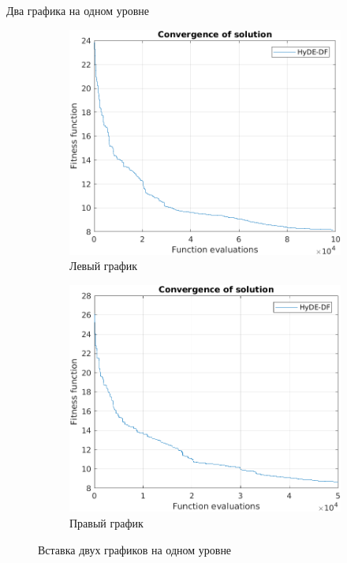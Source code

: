     Два графика на одном уровне
    \begin{figure}[ht!]
        \centering
        \begin{subfigure}{.5\textwidth}
          \centering
          \includegraphics[width=.9\linewidth]{images/Examples/HyDE_100000.png}
          \caption{Левый график}
          \label{fig:sub1}
        \end{subfigure}%
        \begin{subfigure}{.5\textwidth}
          \centering
          \includegraphics[width=.9\linewidth]{images/Examples/HyDE_50000.png}
          \caption{Правый график}
          \label{fig:sub2}
        \end{subfigure}
        \caption{Вставка двух графиков на одном уровне}
        \label{fig:test}
    \end{figure}

